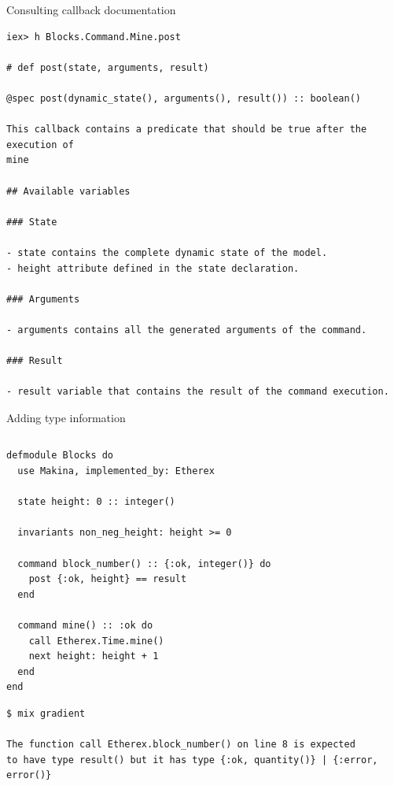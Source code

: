 \documentclass[aspectratio=169, 10pt]{beamer}
\begin{document}
\begin{frame}[label={sec:orge714a6c},fragile]{Consulting callback documentation}
 \lstset{language=shell,label= ,caption= ,captionpos=b,numbers=none,style=display}
\begin{lstlisting}
iex> h Blocks.Command.Mine.post

# def post(state, arguments, result)

@spec post(dynamic_state(), arguments(), result()) :: boolean()

This callback contains a predicate that should be true after the execution of
mine

## Available variables

### State

- state contains the complete dynamic state of the model.
- height attribute defined in the state declaration.

### Arguments

- arguments contains all the generated arguments of the command.

### Result

- result variable that contains the result of the command execution.

\end{lstlisting}
\end{frame}

\begin{frame}[label={sec:orgbde442c},fragile]{Adding type information}
 \begin{columns}
\begin{column}{0.68\columnwidth}
\lstset{language=elixir,label= ,caption= ,captionpos=b,numbers=none,style=display, numbers=left}
\begin{lstlisting}
defmodule Blocks do
  use Makina, implemented_by: Etherex

  state height: 0 :: integer()

  invariants non_neg_height: height >= 0

  command block_number() :: {:ok, integer()} do
    post {:ok, height} == result
  end

  command mine() :: :ok do
    call Etherex.Time.mine()
    next height: height + 1
  end
end
\end{lstlisting}

\lstset{language=shell,label= ,caption= ,captionpos=b,numbers=none,style=display}
\begin{lstlisting}
$ mix gradient

The function call Etherex.block_number() on line 8 is expected
to have type result() but it has type {:ok, quantity()} | {:error, error()}
\end{lstlisting}
\end{column}
\end{columns}
\end{frame}
\end{document}
